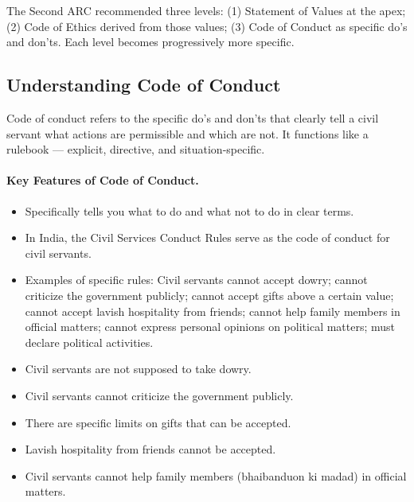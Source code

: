 \begin{KeyConcept}
The Second ARC recommended three levels: (1) Statement of Values at the apex; (2) Code of Ethics derived from those values; (3) Code of Conduct as specific do's and don'ts. Each level becomes progressively more specific.
\end{KeyConcept}

\subsection{Understanding Code of Conduct}
Code of conduct refers to the specific do's and don'ts that clearly tell a civil servant what actions are permissible and which are not. It functions like a rulebook --- explicit, directive, and situation-specific.

\paragraph{Key Features of Code of Conduct.}
\begin{itemize}
\item Specifically tells you what to do and what not to do in clear terms.
\item In India, the Civil Services Conduct Rules serve as the code of conduct for civil servants.
\item Examples of specific rules: Civil servants cannot accept dowry; cannot criticize the government publicly; cannot accept gifts above a certain value; cannot accept lavish hospitality from friends; cannot help family members in official matters; cannot express personal opinions on political matters; must declare political activities.
\end{itemize}

\begin{ExampleBox}
\begin{itemize}
\item Civil servants are not supposed to take dowry.
\item Civil servants cannot criticize the government publicly.
\item There are specific limits on gifts that can be accepted.
\item Lavish hospitality from friends cannot be accepted.
\item Civil servants cannot help family members (bhaibanduon ki madad) in official matters.
\end{itemize}
\end{ExampleBox}

